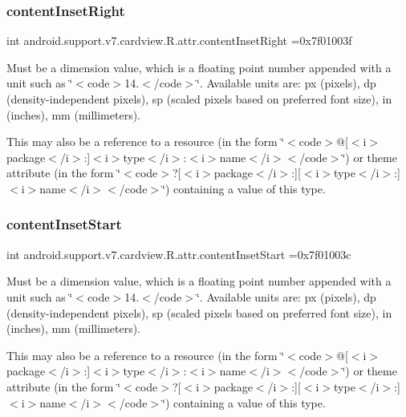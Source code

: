 \subsubsection{\texorpdfstring{content\+Inset\+Right}{contentInsetRight}}
{\footnotesize\ttfamily int android.\+support.\+v7.\+cardview.\+R.\+attr.\+content\+Inset\+Right =0x7f01003f\hspace{0.3cm}{\ttfamily [static]}}

Must be a dimension value, which is a floating point number appended with a unit such as \char`\"{}$<$code$>$14.\+5sp$<$/code$>$\char`\"{}. Available units are\+: px (pixels), dp (density-\/independent pixels), sp (scaled pixels based on preferred font size), in (inches), mm (millimeters). 

This may also be a reference to a resource (in the form \char`\"{}$<$code$>$@\mbox{[}$<$i$>$package$<$/i$>$\+:\mbox{]}$<$i$>$type$<$/i$>$\+:$<$i$>$name$<$/i$>$$<$/code$>$\char`\"{}) or theme attribute (in the form \char`\"{}$<$code$>$?\mbox{[}$<$i$>$package$<$/i$>$\+:\mbox{]}\mbox{[}$<$i$>$type$<$/i$>$\+:\mbox{]}$<$i$>$name$<$/i$>$$<$/code$>$\char`\"{}) containing a value of this type. \mbox{\label{classandroid_1_1support_1_1v7_1_1cardview_1_1R_1_1attr_a0fa2d8301062ba60e97d1f8229caa0e1}} 
\subsubsection{\texorpdfstring{content\+Inset\+Start}{contentInsetStart}}
{\footnotesize\ttfamily int android.\+support.\+v7.\+cardview.\+R.\+attr.\+content\+Inset\+Start =0x7f01003c\hspace{0.3cm}{\ttfamily [static]}}

Must be a dimension value, which is a floating point number appended with a unit such as \char`\"{}$<$code$>$14.\+5sp$<$/code$>$\char`\"{}. Available units are\+: px (pixels), dp (density-\/independent pixels), sp (scaled pixels based on preferred font size), in (inches), mm (millimeters). 

This may also be a reference to a resource (in the form \char`\"{}$<$code$>$@\mbox{[}$<$i$>$package$<$/i$>$\+:\mbox{]}$<$i$>$type$<$/i$>$\+:$<$i$>$name$<$/i$>$$<$/code$>$\char`\"{}) or theme attribute (in the form \char`\"{}$<$code$>$?\mbox{[}$<$i$>$package$<$/i$>$\+:\mbox{]}\mbox{[}$<$i$>$type$<$/i$>$\+:\mbox{]}$<$i$>$name$<$/i$>$$<$/code$>$\char`\"{}) containing a value of this type. \mbox{\label{classandroid_1_1support_1_1v7_1_1cardview_1_1R_1_1attr_ad472a4ef5fdf1c61bfdaa26667c40b08}} 
